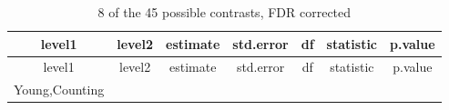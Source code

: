 \documentclass[]{article}
\begin{document}
\begin{longtable}[]{@{}ccccccc@{}}
\caption{8 of the 45 possible contrasts, FDR corrected}\tabularnewline
\toprule
\begin{minipage}[b]{0.16\columnwidth}\centering
level1\strut
\end{minipage} & \begin{minipage}[b]{0.16\columnwidth}\centering
level2\strut
\end{minipage} & \begin{minipage}[b]{0.10\columnwidth}\centering
estimate\strut
\end{minipage} & \begin{minipage}[b]{0.11\columnwidth}\centering
std.error\strut
\end{minipage} & \begin{minipage}[b]{0.05\columnwidth}\centering
df\strut
\end{minipage} & \begin{minipage}[b]{0.11\columnwidth}\centering
statistic\strut
\end{minipage} & \begin{minipage}[b]{0.11\columnwidth}\centering
p.value\strut
\end{minipage}\tabularnewline
\midrule
\endfirsthead
\toprule
\begin{minipage}[b]{0.16\columnwidth}\centering
level1\strut
\end{minipage} & \begin{minipage}[b]{0.16\columnwidth}\centering
level2\strut
\end{minipage} & \begin{minipage}[b]{0.10\columnwidth}\centering
estimate\strut
\end{minipage} & \begin{minipage}[b]{0.11\columnwidth}\centering
std.error\strut
\end{minipage} & \begin{minipage}[b]{0.05\columnwidth}\centering
df\strut
\end{minipage} & \begin{minipage}[b]{0.11\columnwidth}\centering
statistic\strut
\end{minipage} & \begin{minipage}[b]{0.11\columnwidth}\centering
p.value\strut
\end{minipage}\tabularnewline
\midrule
\endhead
\begin{minipage}[t]{0.16\columnwidth}\centering
Young,Counting\strut
\end{minipage} & \begin{minipage}[t]{0.16\columnwidth}\centering

\end{minipage}
\end{longtable}
\end{document}
